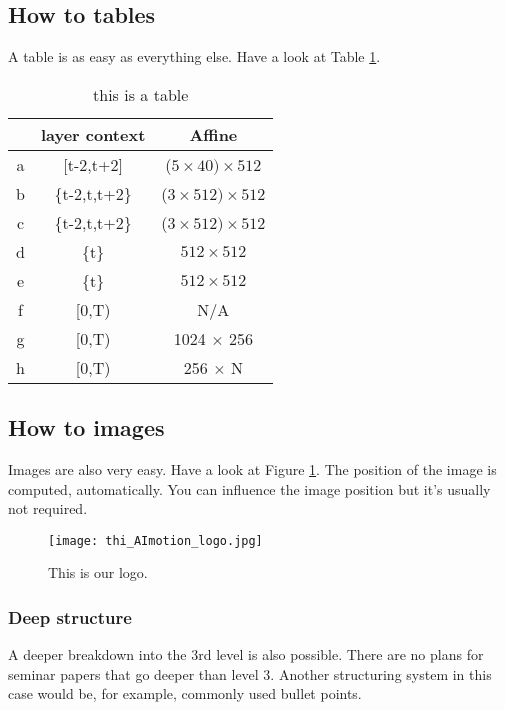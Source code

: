 \subsection{How to tables}
A table is as easy as everything else. Have a look at Table \ref{table}.
\begin{table}[H]
    \caption{this is a table}
    \label{table}
    \small
    \centering
    \setlength{\tabcolsep}{4.5pt}
    \begin{tabular}{|c|c|c|}
        \hline
         & layer context & Affine  \\
        \hline
            a  & [t-2,t+2]     & ($5 \times 40)  \times 512$  \\
            b  & \{t-2,t,t+2\} & ($3 \times 512) \times 512$  \\
            c  & \{t-2,t,t+2\} & ($3 \times 512) \times 512$  \\
            d  & \{t\}         & $512 \times 512$  \\
            e  & \{t\}         & $512 \times 512$  \\
            f  & [0,T) & N/A  \\
            g & [0,T) & 1024 $\times$ 256  \\
            h  & [0,T) & 256 $\times$ N \\
        \hline
    \end{tabular}
\end{table}

\subsection{How to images}
Images are also very easy. Have a look at Figure \ref{aimotionlogo}.
The position of the image is computed, automatically.
You can influence the image position but it's usually not required. 
\begin{figure}[t]
	\centering
	\texttt{[image: thi\_AImotion\_logo.jpg]}
	\caption{This is our logo.}
	\label{aimotionlogo}
\end{figure}

\subsubsection{Deep structure}

A deeper breakdown into the 3rd level is also possible. There are no plans for seminar papers that go deeper than level 3. Another structuring system in this case would be, for example, commonly used bullet points.

